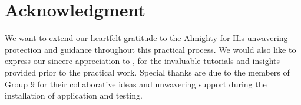 \section*{\centering Acknowledgment}

We want to extend our heartfelt gratitude to the Almighty for His unwavering protection and guidance throughout this practical process. We would also like to express our sincere appreciation  to \lecturer, for the invaluable tutorials and insights provided prior to the practical work. Special thanks are due to the members of Group 9 for their collaborative ideas and unwavering support during the installation of application and testing.

